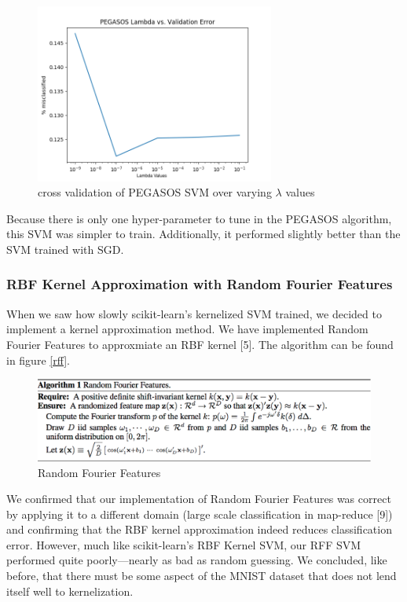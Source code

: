 \documentclass{article} %
\begin{document}
\begin{figure}[h]
\centering
\includegraphics[width=0.7\textwidth]{pegasos-lambda-cv.png}
\caption{cross validation of PEGASOS SVM over varying $\lambda$ values}
\label{fig:pegasos-lambda-cv}
\end{figure}

Because there is only one hyper-parameter to tune in the PEGASOS algorithm, this
SVM was simpler to train. Additionally, it performed slightly better than the
SVM trained with SGD.

\subsubsection{RBF Kernel Approximation with Random Fourier Features}
When we saw how slowly scikit-learn's kernelized SVM trained, we decided to
implement a kernel approximation method. We have implemented Random Fourier
Features to approxmiate an RBF kernel [5]. The algorithm can be found in figure \ref{rff}.

\begin{figure}[h]
\centering
\includegraphics[width=\textwidth]{rff.png}
\caption{Random Fourier Features}
\label{fig:rff}
\end{figure}

We confirmed that our implementation of Random Fourier Features was correct by
applying it to a different domain (large scale classification in map-reduce [9]) and
confirming that the RBF kernel approximation indeed reduces classification
error. However, much like scikit-learn's RBF Kernel SVM, our RFF SVM performed
quite poorly---nearly as bad as random guessing. We concluded, like before, that
there must be some aspect of the MNIST dataset that does not lend itself well to kernelization.
\end{document}
